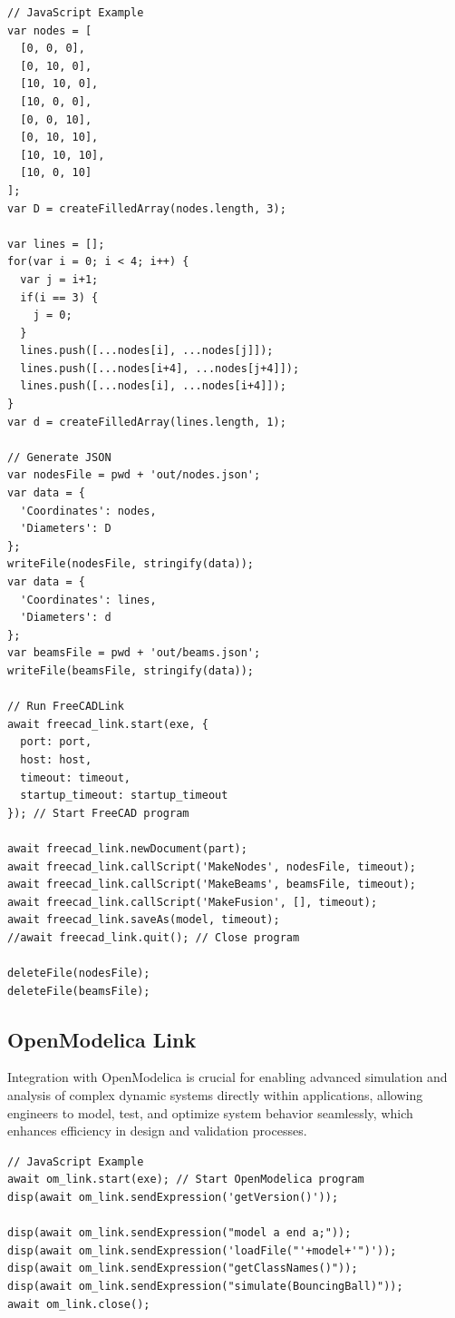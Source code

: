 \documentclass[12pt,a4paper]{article}
\begin{document}
\begin{lstlisting}[style=JavaScriptStyle]
// JavaScript Example
var nodes = [
  [0, 0, 0],
  [0, 10, 0],
  [10, 10, 0],
  [10, 0, 0],
  [0, 0, 10],
  [0, 10, 10],
  [10, 10, 10],
  [10, 0, 10]
];
var D = createFilledArray(nodes.length, 3);

var lines = [];
for(var i = 0; i < 4; i++) {
  var j = i+1;
  if(i == 3) {
    j = 0;
  }
  lines.push([...nodes[i], ...nodes[j]]);
  lines.push([...nodes[i+4], ...nodes[j+4]]);
  lines.push([...nodes[i], ...nodes[i+4]]);
}
var d = createFilledArray(lines.length, 1);

// Generate JSON
var nodesFile = pwd + 'out/nodes.json';
var data = {
  'Coordinates': nodes,
  'Diameters': D
};
writeFile(nodesFile, stringify(data));
var data = {
  'Coordinates': lines,
  'Diameters': d
};
var beamsFile = pwd + 'out/beams.json';
writeFile(beamsFile, stringify(data));

// Run FreeCADLink
await freecad_link.start(exe, {
  port: port,
  host: host,
  timeout: timeout,
  startup_timeout: startup_timeout
}); // Start FreeCAD program

await freecad_link.newDocument(part);
await freecad_link.callScript('MakeNodes', nodesFile, timeout);
await freecad_link.callScript('MakeBeams', beamsFile, timeout);
await freecad_link.callScript('MakeFusion', [], timeout);
await freecad_link.saveAs(model, timeout);
//await freecad_link.quit(); // Close program

deleteFile(nodesFile);
deleteFile(beamsFile);
\end{lstlisting}

\subsection{OpenModelica Link}
\label{sec:openmodelica-link}

Integration with OpenModelica is crucial for enabling advanced simulation and analysis of complex dynamic systems directly within applications, allowing engineers to model, test, and optimize system behavior seamlessly, which enhances efficiency in design and validation processes.

\begin{lstlisting}[style=JavaScriptStyle]
// JavaScript Example
await om_link.start(exe); // Start OpenModelica program
disp(await om_link.sendExpression('getVersion()'));

disp(await om_link.sendExpression("model a end a;"));
disp(await om_link.sendExpression('loadFile("'+model+'")'));
disp(await om_link.sendExpression("getClassNames()"));
disp(await om_link.sendExpression("simulate(BouncingBall)"));
await om_link.close();
\end{lstlisting}
\end{document}
